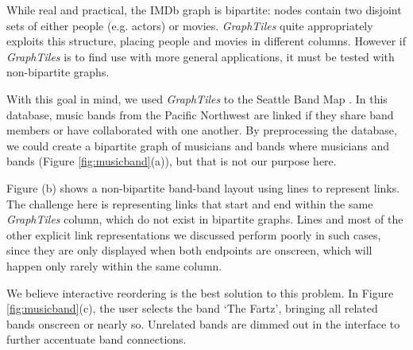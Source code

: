 While real and practical, the IMDb graph is bipartite: nodes contain two disjoint sets of either people (e.g. actors) or movies. \textit{GraphTiles} quite appropriately exploits this structure, placing people and movies in different columns. However if \textit{GraphTiles} is to find use with more general applications, it must be tested with non-bipartite graphs. 

With this goal in mind, we used \textit{GraphTiles} to the Seattle Band Map . In this database, music bands from the Pacific Northwest are linked if they share band members or have collaborated with one another. By preprocessing the database, we could create a bipartite graph of musicians and bands where musicians and bands (Figure \ref{fig:musicband}(a)), but that is not our purpose here. 

Figure (b) shows a non-bipartite band-band layout using lines to represent links. The challenge here is representing links that start and end within the same \textit{GraphTiles} column, which do not exist in bipartite graphs. Lines and most of the other explicit link representations we discussed perform poorly in such cases, since they are only displayed when both endpoints are onscreen, which will happen only rarely within the same column.

We believe interactive reordering is the best solution to this problem. In Figure \ref{fig:musicband}(c), the user selects the band `The Fartz', bringing all related bands onscreen or nearly so. Unrelated bands are dimmed out in the interface to further accentuate band connections.

